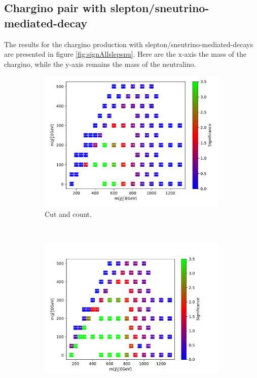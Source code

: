 \subsection{Chargino pair with slepton/sneutrino-mediated-decay}
\label{sec:resC1C1_SlepSnu}

The results for the chargino production with slepton/sneutrino-mediated-decays are presented in figure \ref{fig:signAllslepsnu}. Here are the x-axis the mass of the chargino, while the y-axis remains the mass of the neutralino.

\begin{figure}[H]
    \centering
    \begin{subfigure}[t!]{0.49\textwidth}
    \includegraphics[width = \textwidth]{Figures/Significances/significanceCutandCount_slepsnu_all.pdf}
    \caption{Cut and count.}
        \label{fig:signAllslepsnucandc}
    \end{subfigure}
    \\
    \begin{subfigure}[t!]{0.49\textwidth}
    \includegraphics[width = \textwidth]{Figures/Significances/significance_BDT_slepsnu_All_level.pdf}

\end{subfigure}
\end{figure}

